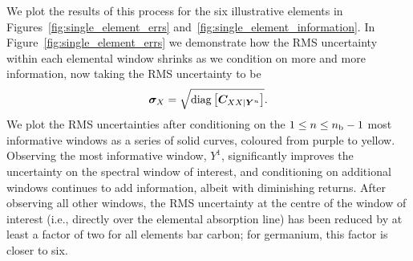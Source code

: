 \documentclass[a4paper,fleqn,usenatbib]{mnras}
\newcommand{\nb}{n_{\rm b}}
\newcommand{\condcov}{{\bm C}}
\begin{document}
We plot the results of this process for the six illustrative elements in Figures~\ref{fig:single_element_errs} and~\ref{fig:single_element_information}. In Figure~\ref{fig:single_element_errs} we demonstrate how the RMS uncertainty within each elemental window shrinks as we condition on more and more information, now taking the RMS uncertainty to be
\begin{equation}
\bm{\sigma}_X = \sqrt{{\rm diag} \left[\condcov_{XX|\bm{Y}^n}\right]}.
\end{equation}
We plot the RMS uncertainties after conditioning on the $1 \le n \le \nb-1$ most informative windows as a series of solid curves, coloured from purple to yellow. Observing the most informative window, $Y^1$, significantly improves the uncertainty on the spectral window of interest, and conditioning on additional windows continues to add information, albeit with diminishing returns. After observing all other windows, the RMS uncertainty at the centre of the window of interest (i.e., directly over the elemental absorption line) has been reduced by at least a factor of two for all elements bar carbon; for germanium, this factor is closer to six.
\end{document}
